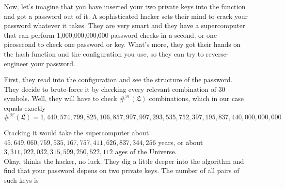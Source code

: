 \documentclass[12pt, a4paper]{article}
\renewcommand{\H}{\mathcal{H}}
\renewcommand{\S}{\mathcal{S}}
\newcommand{\conf}{\mathfrak{L}}
\begin{document}
Now, let's imagine that you have inserted your two private keys into the function and got a password out of it. A sophisticated hacker sets their mind to crack your password whatever it takes. They are very smart and they have a supercomputer that can perform 1,000,000,000,000 password checks in a second, or one picosecond to check one password or key. What's more, they got their hands on the hash function and the configuration you use, so they can try to reverse-engineer your password.

First, they read into the configuration and see the structure of the password. They decide to brute-force it by checking every relevant combination of 30 symbols. Well, they will have to check $ \#^{\H}(\conf) $ combinations, which in our case equals exactly
\[ \#^{\H}(\conf) = 1,440,574,799,825,106,857,997,997,293,535,752,397,195,837,440,000,000,000 \]

Cracking it would take the supercomputer about $ 45,649,060,759,535,167,757,411,626,837,344,256 $ years, or about $ 3,311,022,032,315,599,250,522,112 $ ages of the Universe.\\

Okay, thinks the hacker, no luck. They dig a little deeper into the algorithm and find that your password depens on two private keys. The number of all pairs of such keys is

%
%
\end{document}
